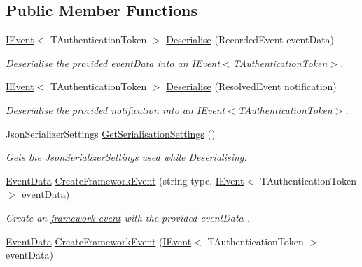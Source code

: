 \subsection*{Public Member Functions}
\begin{DoxyCompactItemize}
\item 
\hyperlink{interfaceCqrs_1_1Events_1_1IEvent}{I\+Event}$<$ T\+Authentication\+Token $>$ \hyperlink{classCqrs_1_1EventStore_1_1EventFactory_abfd04f6833e4f010234d84a591f6eb6b_abfd04f6833e4f010234d84a591f6eb6b}{Deserialise} (Recorded\+Event event\+Data)
\begin{DoxyCompactList}\small\item\em Deserialise the provided {\itshape event\+Data}  into an I\+Event$<$\+T\+Authentication\+Token$>$. \end{DoxyCompactList}\item 
\hyperlink{interfaceCqrs_1_1Events_1_1IEvent}{I\+Event}$<$ T\+Authentication\+Token $>$ \hyperlink{classCqrs_1_1EventStore_1_1EventFactory_a1be7f3c4014991bc4b9619eaa2e8b9a4_a1be7f3c4014991bc4b9619eaa2e8b9a4}{Deserialise} (Resolved\+Event notification)
\begin{DoxyCompactList}\small\item\em Deserialise the provided {\itshape notification}  into an I\+Event$<$\+T\+Authentication\+Token$>$. \end{DoxyCompactList}\item 
Json\+Serializer\+Settings \hyperlink{classCqrs_1_1EventStore_1_1EventFactory_a4e52c4fd639d1af97b1ecc5052189783_a4e52c4fd639d1af97b1ecc5052189783}{Get\+Serialisation\+Settings} ()
\begin{DoxyCompactList}\small\item\em Gets the Json\+Serializer\+Settings used while Deserialising. \end{DoxyCompactList}\item 
\hyperlink{classCqrs_1_1Events_1_1EventData}{Event\+Data} \hyperlink{classCqrs_1_1EventStore_1_1EventFactory_a91394437675f3185d2105c6a79f7b5aa_a91394437675f3185d2105c6a79f7b5aa}{Create\+Framework\+Event} (string type, \hyperlink{interfaceCqrs_1_1Events_1_1IEvent}{I\+Event}$<$ T\+Authentication\+Token $>$ event\+Data)
\begin{DoxyCompactList}\small\item\em Create an \hyperlink{}{framework event} with the provided {\itshape event\+Data} . \end{DoxyCompactList}\item 
\hyperlink{classCqrs_1_1Events_1_1EventData}{Event\+Data} \hyperlink{classCqrs_1_1EventStore_1_1EventFactory_ae514998a8368283f882014cc0db5b2b2_ae514998a8368283f882014cc0db5b2b2}{Create\+Framework\+Event} (\hyperlink{interfaceCqrs_1_1Events_1_1IEvent}{I\+Event}$<$ T\+Authentication\+Token $>$ event\+Data)

\end{DoxyCompactItemize}
